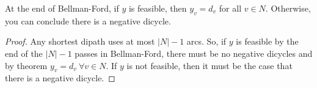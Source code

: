 \begin{corollary}{}{}
    At the end of Bellman-Ford, if $y$ is feasible, then $y_v = d_v$ for all $v \in N$. Otherwise, you can conclude there is a negative dicycle.
\end{corollary}
\begin{proof}
    Any shortest dipath uses at most $|N| - 1$ arcs. So, if $y$ is feasible by the end of the $|N| -1$ passes in Bellman-Ford, there must be no negative dicycles and by theorem $y_v = d_v \:\forall v \in N$. If $y$ is not feasible, then it must be the case that there is a negative dicycle.
\end{proof}